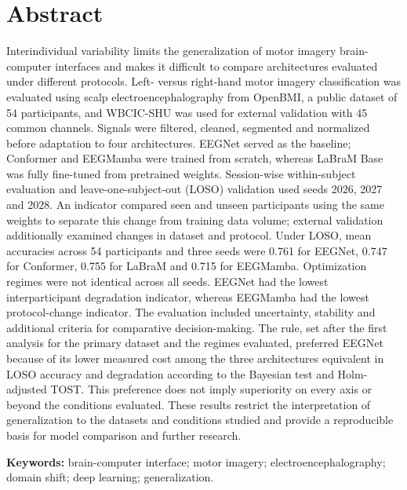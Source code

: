 \chapter*{Abstract}
Interindividual variability limits the generalization of motor imagery brain-computer interfaces and makes it difficult to compare architectures evaluated under different protocols. Left- versus right-hand motor imagery classification was evaluated using scalp electroencephalography from OpenBMI, a public dataset of 54 participants, and WBCIC-SHU was used for external validation with 45 common channels. Signals were filtered, cleaned, segmented and normalized before adaptation to four architectures. EEGNet served as the baseline; Conformer and EEGMamba were trained from scratch, whereas LaBraM Base was fully fine-tuned from pretrained weights. Session-wise within-subject evaluation and leave-one-subject-out (LOSO) validation used seeds 2026, 2027 and 2028. An indicator compared seen and unseen participants using the same weights to separate this change from training data volume; external validation additionally examined changes in dataset and protocol. Under LOSO, mean accuracies across 54 participants and three seeds were 0.761 for EEGNet, 0.747 for Conformer, 0.755 for LaBraM and 0.715 for EEGMamba. Optimization regimes were not identical across all seeds. EEGNet had the lowest interparticipant degradation indicator, whereas EEGMamba had the lowest protocol-change indicator. The evaluation included uncertainty, stability and additional criteria for comparative decision-making. The rule, set after the first analysis for the primary dataset and the regimes evaluated, preferred EEGNet because of its lower measured cost among the three architectures equivalent in LOSO accuracy and degradation according to the Bayesian test and Holm-adjusted TOST. This preference does not imply superiority on every axis or beyond the conditions evaluated. These results restrict the interpretation of generalization to the datasets and conditions studied and provide a reproducible basis for model comparison and further research.

\noindent\textbf{Keywords:} brain-computer interface; motor imagery; electroencephalography; domain shift; deep learning; generalization.
